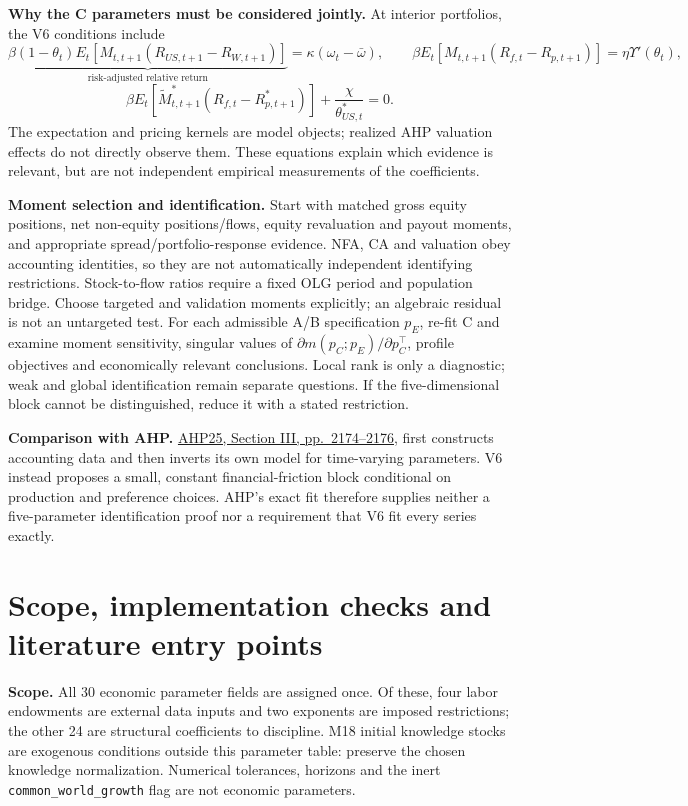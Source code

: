 \documentclass[10pt,a4paper,landscape]{article}
\newcommand{\code}[1]{{\footnotesize\texttt{#1}}}
\newcommand{\lit}[2]{\hyperlink{ref:#1}{#2}}
\begin{document}
\textbf{Why the C parameters must be considered jointly.}
At interior portfolios, the V6 conditions include
\[
\underbrace{\beta(1-\theta_t)E_t[M_{t,t+1}(R_{US,t+1}-R_{W,t+1})]}_{\text{risk-adjusted relative return}}
=\kappa(\omega_t-\bar\omega),\qquad
\beta E_t[M_{t,t+1}(R_{f,t}-R_{p,t+1})]=\eta\Upsilon'(\theta_t),
\]
\[
\beta E_t[\widetilde M^*_{t,t+1}(R_{f,t}-R^*_{p,t+1})]
+\frac{\chi}{\theta^*_{US,t}}=0.
\]
The expectation and pricing kernels are model objects; realized AHP valuation effects do not directly observe them. These equations explain which evidence is relevant, but are not independent empirical measurements of the coefficients.

\textbf{Moment selection and identification.}
Start with matched gross equity positions, net non-equity positions/flows, equity revaluation and payout moments, and appropriate spread/portfolio-response evidence. NFA, CA and valuation obey accounting identities, so they are not automatically independent identifying restrictions. Stock-to-flow ratios require a fixed OLG period and population bridge. Choose targeted and validation moments explicitly; an algebraic residual is not an untargeted test.
For each admissible A/B specification $p_E$, re-fit C and examine moment sensitivity, singular values of $\partial m(p_C;p_E)/\partial p_C^\top$, profile objectives and economically relevant conclusions. Local rank is only a diagnostic; weak and global identification remain separate questions. If the five-dimensional block cannot be distinguished, reduce it with a stated restriction.

\textbf{Comparison with AHP.}
\lit{AHP}{AHP25, Section III, pp.\ 2174--2176}, first constructs accounting data and then inverts its own model for time-varying parameters. V6 instead proposes a small, constant financial-friction block conditional on production and preference choices. AHP's exact fit therefore supplies neither a five-parameter identification proof nor a requirement that V6 fit every series exactly.


\clearpage
\section{Scope, implementation checks and literature entry points}
\textbf{Scope.} All 30 economic parameter fields are assigned once. Of these, four labor endowments are external data inputs and two exponents are imposed restrictions; the other 24 are structural coefficients to discipline. M18 initial knowledge stocks are exogenous conditions outside this parameter table: preserve the chosen knowledge normalization. Numerical tolerances, horizons and the inert \code{common\_world\_growth} flag are not economic parameters.
\end{document}
